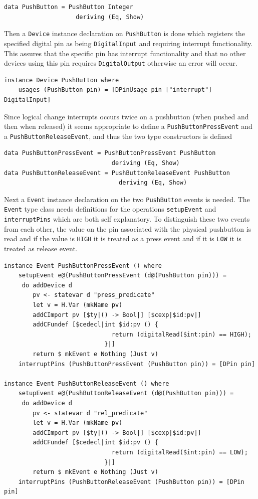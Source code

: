 \documentclass[a4paper, oneside, final]{memoir}
\begin{document}
\begin{verbatim}
data PushButton = PushButton Integer
                    deriving (Eq, Show)
\end{verbatim}

\noindent
Then a \texttt{Device} instance declaration on \texttt{PushButton} is done which
registers the specified digital pin as being \texttt{DigitalInput} and requiring
interrupt functionality. This assures that the specific pin has interrupt
functionality and that no other devices using this pin requires
\texttt{DigitalOutput} otherwise an error will occur.

\begin{verbatim}
instance Device PushButton where
    usages (PushButton pin) = [DPinUsage pin ["interrupt"] DigitalInput]
\end{verbatim}

Since logical change interrupts occurs twice on a pushbutton (when
pushed and then when released) it seems appropriate to define a
\texttt{PushButtonPressEvent} and a \texttt{PushButtonReleaseEvent},
and thus the two type constructors is defined

\begin{verbatim}
data PushButtonPressEvent = PushButtonPressEvent PushButton
                              deriving (Eq, Show)
data PushButtonReleaseEvent = PushButtonReleaseEvent PushButton
                                deriving (Eq, Show)
\end{verbatim}

\noindent
Next a \texttt{Event} instance declaration on the two \texttt{PushButton} events
is needed. The \texttt{Event} type class needs definitions for the operations
\texttt{setupEvent} and \texttt{interruptPins} which are both self
explanatory. To distinguish these two events from each other, the value on the
pin associated with the physical pushbutton is read and if the value is
\texttt{HIGH} it is treated as a press event and if it is \texttt{LOW} it is
treated as release event.

\begin{verbatim}
instance Event PushButtonPressEvent () where
    setupEvent e@(PushButtonPressEvent (d@(PushButton pin))) = 
     do addDevice d
        pv <- statevar d "press_predicate" 
        let v = H.Var (mkName pv)
        addCImport pv [$ty|() -> Bool|] [$cexp|$id:pv|]
        addCFundef [$cedecl|int $id:pv () {
                              return (digitalRead($int:pin) == HIGH);
                            }|]
        return $ mkEvent e Nothing (Just v)
    interruptPins (PushButtonPressEvent (PushButton pin)) = [DPin pin]

instance Event PushButtonReleaseEvent () where
    setupEvent e@(PushButtonReleaseEvent (d@(PushButton pin))) = 
     do addDevice d 
        pv <- statevar d "rel_predicate" 
        let v = H.Var (mkName pv)
        addCImport pv [$ty|() -> Bool|] [$cexp|$id:pv|]
        addCFundef [$cedecl|int $id:pv () {
                              return (digitalRead($int:pin) == LOW);
                            }|]
        return $ mkEvent e Nothing (Just v)
    interruptPins (PushButtonReleaseEvent (PushButton pin)) = [DPin pin]
\end{verbatim}
\end{document}
